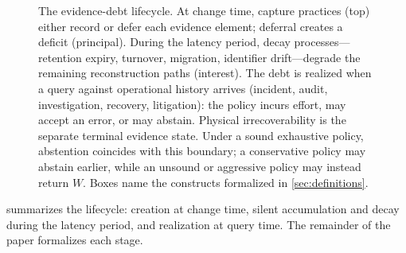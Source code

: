 \begin{figure}[t]
\centering
\resizebox{\columnwidth}{!}{}
\caption{The evidence-debt lifecycle. At change time, capture practices (top) either
record or defer each evidence element; deferral creates a deficit (principal). During
the latency period, decay processes---retention expiry, turnover, migration,
identifier drift---degrade the remaining reconstruction paths (interest). The debt is
realized when a query against operational history arrives (incident, audit,
investigation, recovery, litigation): the policy incurs effort, may accept an error,
or may abstain. Physical irrecoverability is the separate terminal evidence state.
Under a sound exhaustive policy, abstention coincides with this boundary; a
conservative policy may abstain earlier, while an unsound or aggressive policy may
instead return $W$. Boxes name the constructs formalized in \cref{sec:definitions}.}
\label{fig:lifecycle}
\end{figure}

 summarizes the lifecycle: creation at change time, silent
accumulation and decay during the latency period, and realization at query time.
The remainder of the paper formalizes each stage.
